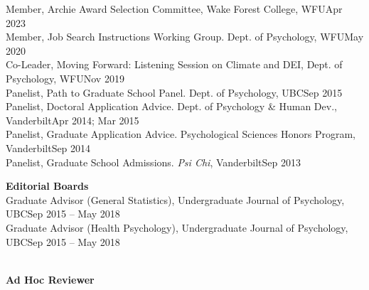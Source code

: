 Member, Archie Award Selection Committee, Wake Forest College, WFU\hfill{Apr 2023}\\ 
Member, Job Search Instructions Working Group. Dept. of Psychology, WFU\hfill{May 2020}\\
Co-Leader, Moving Forward: Listening Session on Climate and DEI, Dept. of Psychology, WFU\hfill {Nov 2019}\\
Panelist, Path to Graduate School Panel. Dept. of Psychology, UBC\hfill {Sep 2015}\\
Panelist, Doctoral Application Advice. Dept. of Psychology \& Human Dev., Vanderbilt\hfill {Apr 2014; Mar 2015}\\
Panelist, Graduate Application Advice. Psychological Sciences Honors Program, Vanderbilt\hfill {Sep 2014}\\
Panelist, Graduate School Admissions. \textit{Psi Chi}, Vanderbilt\hfill{Sep 2013}\medskip\\
%
%
\begin{minipage}{\linewidth}\vspace{1.1mm} {\large \textbf{Editorial Boards}}\\
Graduate Advisor (General Statistics), Undergraduate Journal of Psychology, UBC\hfill{Sep 2015 – May 2018}\\
Graduate Advisor (Health Psychology), Undergraduate Journal of Psychology, UBC\hfill{Sep 2015 – May 2018}\end{minipage}\medskip\\
{\large \textbf{Ad Hoc Reviewer}}\smallskip\\
